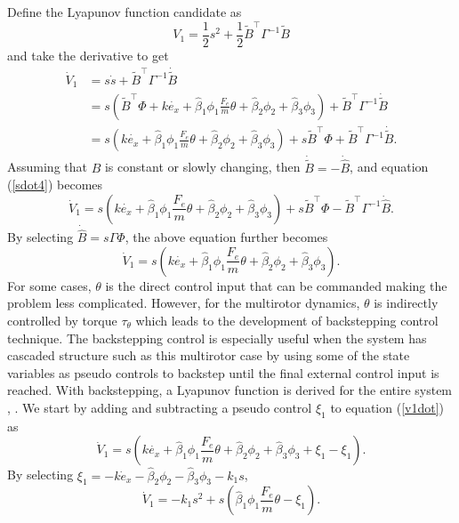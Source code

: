 Define the Lyapunov function candidate as
\begin{equation}
V_1=\frac{1}{2}s^2+\frac{1}{2}\tilde{B}^\top \Gamma^{-1}\tilde{B}
\label{v1}
\end{equation}
and take the derivative to get
\begin{align}
\dot{V}_1&=s\dot{s}+\tilde{B}^\top \Gamma^{-1}\dot{\tilde{B}}
\\&=s(\tilde{B}^\top\Phi+k\dot{e_x}+\hat{\beta}_1\phi_1\frac{F_e}{m}\theta+\hat{\beta}_2\phi_2+\hat{\beta}_3\phi_3)+\tilde{B}^\top \Gamma^{-1}\dot{\tilde{B}}
\\&=s(k\dot{e_x}+\hat{\beta}_1\phi_1\frac{F_e}{m}\theta+\hat{\beta}_2\phi_2+\hat{\beta}_3\phi_3)+s\tilde{B}^\top\Phi+\tilde{B}^\top \Gamma^{-1}\dot{\tilde{B}}.
\label{sdot4}
\end{align}
Assuming that $B$ is constant or slowly changing, then $\dot{\tilde{B}}=-\dot{\hat{B}}$, and equation (\ref{sdot4}) becomes 
\begin{equation}
\dot{V}_1=s(k\dot{e_x}+\hat{\beta}_1\phi_1\frac{F_e}{m}\theta+\hat{\beta}_2\phi_2+\hat{\beta}_3\phi_3)+s\tilde{B}^\top\Phi-\tilde{B}^\top \Gamma^{-1}\dot{\hat{B}}.
\end{equation}
By selecting $\dot{\hat{B}}=s\Gamma\Phi$, the above equation further becomes 
\begin{equation}
\dot{V}_1=s(k\dot{e_x}+\hat{\beta}_1\phi_1\frac{F_e}{m}\theta+\hat{\beta}_2\phi_2+\hat{\beta}_3\phi_3).
\label{v1dot}
\end{equation}
For some cases, $\theta$ is the direct control input that can be commanded making the problem less complicated. However, for the multirotor dynamics, $\theta$ is indirectly controlled by torque $\tau_\theta$ which leads to the development of backstepping control technique. The backstepping control is especially useful when the system has cascaded structure such as this multirotor case by using some of the state variables as pseudo controls to backstep until the final external control input is reached. With backstepping, a Lyapunov function is derived for the entire system \cite{khalil1996noninear}, \cite{raptis2010linear}. We start by adding and subtracting a pseudo control $\xi_1$ to equation (\ref{v1dot}) as
\begin{equation}
\dot{V}_1=s(k\dot{e_x}+\hat{\beta}_1\phi_1\frac{F_e}{m}\theta+\hat{\beta}_2\phi_2+\hat{\beta}_3\phi_3+\xi_1-\xi_1).
\end{equation}
By selecting $\xi_1=-k\dot{e}_x-\hat{\beta}_2\phi_2-\hat{\beta}_3\phi_3-k_1s$, 
\begin{equation}
\dot{V}_1=-k_1s^2+ s(\hat{\beta}_1\phi_1\frac{F_e}{m}\theta-\xi_1).
\label{v2dot}
\end{equation}
